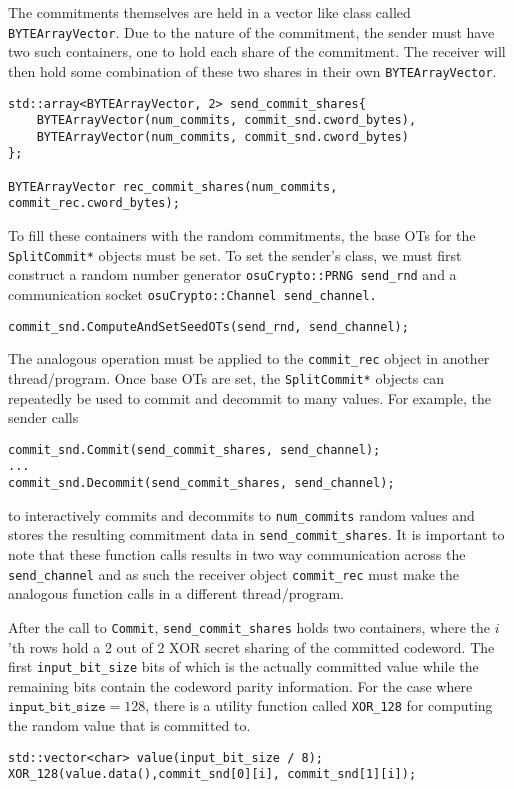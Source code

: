 The commitments themselves are held in a vector like class called \texttt{BYTEArrayVector}. Due to the nature of the commitment, the sender must have two such containers, one to hold each share of the commitment. The receiver will then hold some combination of these two shares in their own \texttt{BYTEArrayVector}.
\begin{lstlisting}
std::array<BYTEArrayVector, 2> send_commit_shares{
	BYTEArrayVector(num_commits, commit_snd.cword_bytes),
	BYTEArrayVector(num_commits, commit_snd.cword_bytes)
};

BYTEArrayVector rec_commit_shares(num_commits, commit_rec.cword_bytes);
\end{lstlisting}
To fill these containers with the random commitments, the base OTs for the \texttt{SplitCommit*} objects must be set. To set the sender's class, we must first construct a random number generator \texttt{osuCrypto::PRNG send\_rnd} and a communication socket \texttt{osuCrypto::Channel send\_channel.} 
\begin{lstlisting}
commit_snd.ComputeAndSetSeedOTs(send_rnd, send_channel);
\end{lstlisting}
The analogous operation must be applied to the \texttt{commit\_rec} object in another thread/program. Once base OTs are set, the \texttt{SplitCommit*} objects can repeatedly be used to commit and decommit to many values. For example, the sender calls
\begin{lstlisting}     
commit_snd.Commit(send_commit_shares, send_channel);
...
commit_snd.Decommit(send_commit_shares, send_channel);
\end{lstlisting}
to interactively commits and decommits to \texttt{num\_commits} random values and stores the resulting commitment data in \texttt{send\_commi\allowbreak t\_shares}. It is important to note that these function calls results in two way communication across the  \texttt{send\_channel} and as such the receiver object \texttt{commit\_rec} must make the analogous function calls in a different thread/program. 

After the call to \texttt{Commit}, \texttt{send\_commit\_shares} holds two containers, where the $i$'th rows hold a 2 out of 2 XOR secret sharing of the committed codeword. The first \texttt{input\_bit\_size} bits of which is the actually committed value while the remaining bits contain the codeword parity information. For the case where $\texttt{input\_bit\_size} =128$, there is a utility function called \texttt{XOR\_128} for computing the random value that is committed to.
\begin{lstlisting}     
std::vector<char> value(input_bit_size / 8);
XOR_128(value.data(),commit_snd[0][i], commit_snd[1][i]);
\end{lstlisting}

